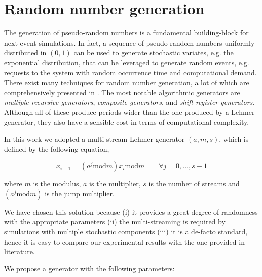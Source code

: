 \section{Random number generation}
\label{sec:random-number-generation}

The generation of pseudo-random numbers is a fundamental building-block for next-event simulations.
%
In fact, a sequence of pseudo-random numbers uniformly distributed in $(0,1)$ can be used to generate stochastic variates, e.g. the exponential distribution, that can be leveraged to generate random events, e.g. requests to the system with random occurrence time and computational demand.
%
There exist many techniques for random number generation, a lot of which are comprehensively presented in \cite{l1994uniform}.
The most notable algorithmic generators are \textit{multiple recursive generators}, \textit{composite generators}, and \textit{shift-register generators}.
Although all of these produce periods wider than the one produced by a Lehmer generator, they also have a sensible cost in terms of computational complexity.

In this work we adopted a multi-stream Lehmer generator $(a,m,s)$, which is defined by the following equation,

\begin{equation}
\label{eqn:lehmer}
x_{i+1} = (a^{j} \mathrm{mod}m) x_{i} \mathrm{mod}m \qquad\forall j=0,...,s-1
\end{equation}

where $m$ is the modulus, $a$ is the multiplier, $s$ is the number of streams and $(a^{j} \mathrm{mod}m)$ is the jump multiplier.

We have chosen this solution because (i) it provides a great degree of randomness with the appropriate parameters (ii) the multi-streaming is required by simulations with multiple stochastic components (iii) it is a de-facto standard, hence it is easy to compare our experimental results with the one provided in literature.

We propose a generator with the following parameters:

